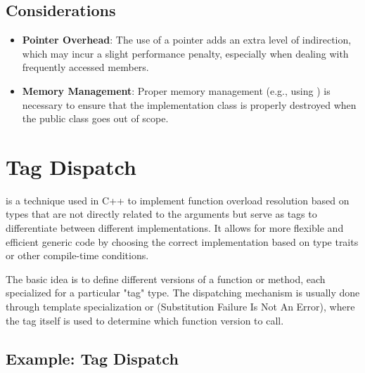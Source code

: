 \subsection{Considerations}
\begin{itemize}
    \item \textbf{Pointer Overhead}: The use of a pointer adds an extra level of indirection, which may incur a slight performance penalty, especially when dealing with frequently accessed members.
    \item \textbf{Memory Management}: Proper memory management (e.g., using ) is necessary to ensure that the implementation class is properly destroyed when the public class goes out of scope.
\end{itemize}











\section{Tag Dispatch}

 is a technique used in C++ to implement function overload resolution based on types that are not directly related to the arguments but serve as tags to differentiate between different implementations. It allows for more flexible and efficient generic code by choosing the correct implementation based on type traits or other compile-time conditions.

The basic idea is to define different versions of a function or method, each specialized for a particular "tag" type. The dispatching mechanism is usually done through template specialization or  (Substitution Failure Is Not An Error), where the tag itself is used to determine which function version to call.

\subsection{Example: Tag Dispatch}

